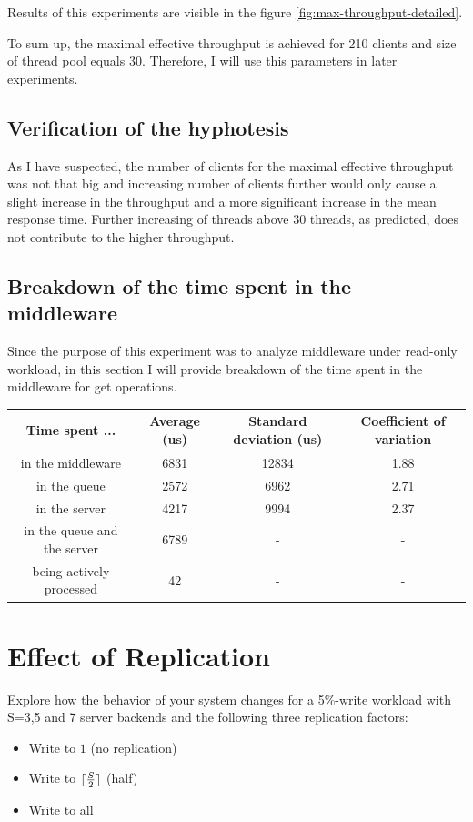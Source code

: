 \documentclass[11pt]{article}
\DeclarePairedDelimiter{\ceil}{\lceil}{\rceil}
\begin{document}
Results of this experiments are visible in the figure \ref{fig:max-throughput-detailed}.


To sum up, the maximal effective throughput is achieved for 210 clients and size of thread pool equals 30. Therefore, I will use this parameters in later experiments.  

\subsection{Verification of the hyphotesis}

As I have suspected, the number of clients for the maximal effective throughput was not that big and increasing number of clients further would only cause a slight increase in the throughput and a more significant increase in the mean response time. Further increasing of threads above 30 threads, as predicted, does not contribute to the higher throughput.

\subsection{Breakdown of the time spent in the middleware}
\label{sec:time-breakdown}

Since the purpose of this experiment was to analyze middleware under read-only workload, in this section I will provide breakdown of the time spent in the middleware for get operations.
\medskip

\begin{tabular}{|c|c|c|c|}
\hline \bf{Time spent ...} & \bf{Average (us)} & \bf{Standard deviation (us)} & \bf{Coefficient of variation} \\ 
\hline in the middleware & 6831 & 12834 & 1.88 \\
\hline in the queue & 2572 & 6962 & 2.71\\
\hline in the server & 4217 & 9994 & 2.37\\
\hline in the queue and the server & 6789 & - & -\\
\hline being actively processed & 42 & - & -\\
\hline
\end{tabular}
\medskip

\pagebreak

\section{Effect of Replication}

\iffalse
Explore how the behavior of your system changes for a 5\%-write workload with S=3,5 and 7 server backends and the following three replication factors:
\begin{itemize} 
\item Write to $1$ (no replication) 
\item Write to $\ceil{\frac{S}{2}}$ (half) 
\item Write to all 
\end{itemize}
\end{document}
